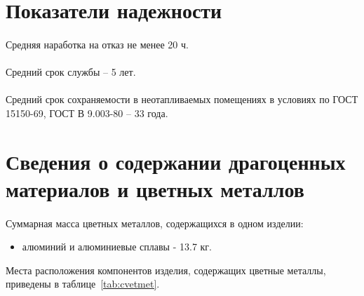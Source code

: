 \section{Показатели надежности}

\paragraph{} Средняя наработка на отказ не менее 20 ч.

\paragraph{} Средний срок службы -- 5 лет.

\paragraph{} Средний срок сохраняемости в неотапливаемых помещениях в условиях по ГОСТ 15150-69, ГОСТ В 9.003-80 -- 33 года.


\section{Сведения о содержании драгоценных материалов и цветных металлов}
 
\paragraph{} Суммарная масса цветных металлов, содержащихся в одном изделии:
\begin{itemize}
\item алюминий и алюминиевые сплавы - 13.7 кг.
\end{itemize}
		
Места расположения компонентов изделия, содержащих цветные металлы, приведены в таблице~\ref{tab:cvetmet}.

